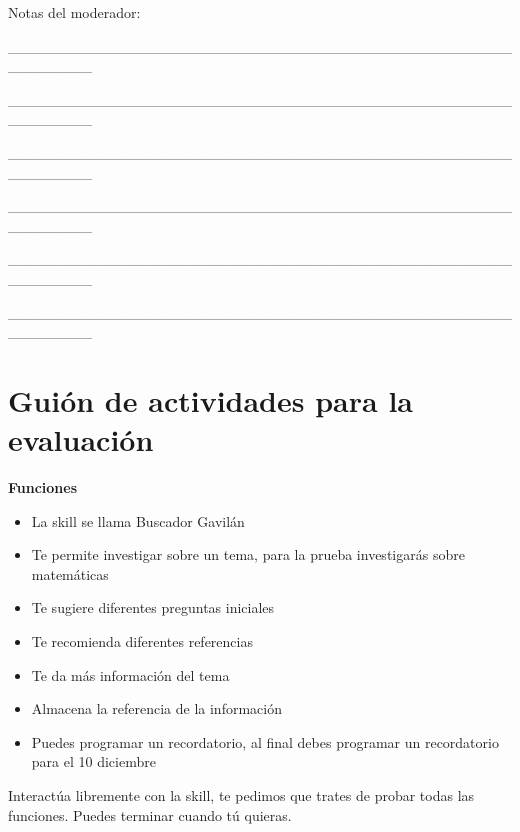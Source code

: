 \begin{tcolorbox}[colback=white!25!white,colframe=blue]
  Notas del moderador:

  \_\_\_\_\_\_\_\_\_\_\_\_\_\_\_\_\_\_\_\_\_\_\_\_\_\_\_\_\_\_\_\_\_\_\_\_\_\_\_\_\_\_\_\_\_\_\_\_\_\_\_\_\_\_\_\_

  \_\_\_\_\_\_\_\_\_\_\_\_\_\_\_\_\_\_\_\_\_\_\_\_\_\_\_\_\_\_\_\_\_\_\_\_\_\_\_\_\_\_\_\_\_\_\_\_\_\_\_\_\_\_\_\_

  \_\_\_\_\_\_\_\_\_\_\_\_\_\_\_\_\_\_\_\_\_\_\_\_\_\_\_\_\_\_\_\_\_\_\_\_\_\_\_\_\_\_\_\_\_\_\_\_\_\_\_\_\_\_\_\_

  \_\_\_\_\_\_\_\_\_\_\_\_\_\_\_\_\_\_\_\_\_\_\_\_\_\_\_\_\_\_\_\_\_\_\_\_\_\_\_\_\_\_\_\_\_\_\_\_\_\_\_\_\_\_\_\_

  \_\_\_\_\_\_\_\_\_\_\_\_\_\_\_\_\_\_\_\_\_\_\_\_\_\_\_\_\_\_\_\_\_\_\_\_\_\_\_\_\_\_\_\_\_\_\_\_\_\_\_\_\_\_\_\_

  \_\_\_\_\_\_\_\_\_\_\_\_\_\_\_\_\_\_\_\_\_\_\_\_\_\_\_\_\_\_\_\_\_\_\_\_\_\_\_\_\_\_\_\_\_\_\_\_\_\_\_\_\_\_\_\_

\end{tcolorbox}


\section{Guión de actividades para la evaluación}
\label{B4Anexo}

\begin{tcolorbox}[colback=white!25!white,colframe=blue]
  \textbf{Funciones}
  \begin{itemize}
    \item La skill se llama Buscador Gavilán
    \item Te permite investigar sobre un tema, para la prueba investigarás sobre matemáticas
    \item Te sugiere diferentes preguntas iniciales
    \item Te recomienda diferentes referencias
    \item Te da más información del tema
    \item Almacena la referencia de la información
    \item Puedes programar un recordatorio, al final debes programar un recordatorio para el 10 diciembre
  \end{itemize}

  Interactúa libremente con la skill, te pedimos que trates de probar todas las funciones.
  Puedes terminar cuando tú quieras.

\end{tcolorbox}

